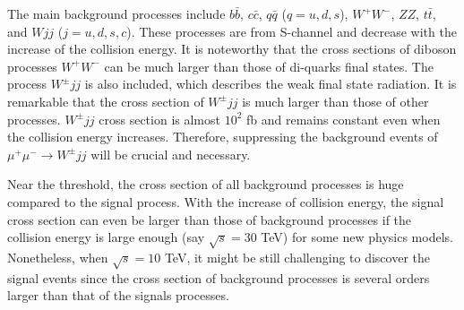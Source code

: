 \documentclass[a4paper,11pt]{article}
\begin{document}
The main background processes include $b\bar{b}$, $c\bar{c}$, $q\bar{q}$ ($q=u,d,s$), $W^+ W^-$, $ZZ$, $t \bar{t}$, and $Wjj$ ($j=u,d,s,c$). 
These processes are from S-channel and decrease with the increase of the collision energy. 
It is noteworthy that the cross sections of diboson processes $W^+W^-$ can be much larger than those of di-quarks final states. 
The process $W^\pm jj$ is also included, which describes the weak final state radiation. 
It is remarkable that the cross section of $W^\pm jj$ is much larger than those of other processes. $W^\pm jj$ cross section is almost $10^2$ fb and remains constant even when the collision energy increases. 
Therefore, suppressing the background events of $\mu^+ \mu^- \to W^\pm jj$ will be crucial and necessary.

Near the threshold, the cross section of all background processes is huge compared to the signal process. 
With the increase of collision energy, 
the signal cross section can even be larger than those of background processes if the collision energy is large enough (say $\sqrt{s}=30$ TeV) for some new physics models. 
Nonetheless, when $\sqrt{s}=10$ TeV, it might be still challenging to discover the signal events since the cross section of background processes is several orders larger than that of the signals processes.
\end{document}
